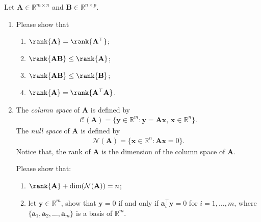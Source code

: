 \begin{exercise}
	Let $\mathbf{A} \in \mathbb{R}^{m\times n}$ and $\mathbf{B}\in \mathbb{R}^{n\times p}$.
	\begin{enumerate}
	    \item Please show that
            \begin{enumerate}
                \item $\rank{\mathbf{A}} = \rank{\mathbf{A}^{\top}}$;
                \item $\rank{\mathbf{A}\mathbf{B}} \leq \rank{\mathbf{A}}$;
                \item $\rank{\mathbf{A}\mathbf{B}} \leq \rank{\mathbf{B}}$;
                \item $\rank{\mathbf{A}} = \rank{\mathbf{A}^{\top}  \mathbf{A}}$.
            \end{enumerate}
        \item The \emph{column space} of $\mathbf{A}$ is defined by
                \begin{align*}
                    \mathcal{C}(\mathbf{A} ) = \{ \mathbf{y}\in \mathbb{R}^m : \mathbf{y} = \mathbf{Ax},\,\mathbf{x}\in\mathbb{R}^n\}.
                \end{align*}
                The \emph{null space} of $\mathbf{A}$ is defined by
                \begin{align*}
                    \mathcal{N}(\mathbf{A})  = \{ \mathbf{x}\in \mathbb{R}^n : \mathbf{Ax}=0\}.
                \end{align*}
                Notice that, the rank of $\mathbf{A}$ is the dimension of the column space of $\mathbf{A}$.
                
                Please show that:
	               \begin{enumerate}
                	    \item $\rank{\mathbf{A}} + \dim ( \mathcal{N}( \mathbf{A} ) ) = n$;
                	    \item let $\mathbf{y}\in \mathbb{R}^m$, show that $\mathbf{y}=0$ if and only if $\mathbf{a}_i^{\top}\mathbf{y}=0$ for $i=1,\ldots,m$, where $\{\mathbf{a}_1,\mathbf{a}_2,\ldots,\mathbf{a}_m\}$ is a basis of $\mathbb{R}^m$.
                	\end{enumerate}    
	\end{enumerate}
\end{exercise}


